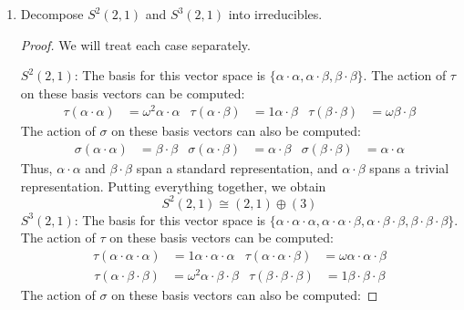 \documentclass[../psets.tex]{subfiles}
\begin{document}
\begin{enumerate}
\begin{enumerate}
\begin{proof}
\begin{align*}
                \Aboxed{\Lambda^2V &\cong (2,1)\oplus(1,1,1)}
            \end{align*}
        \end{proof}
        \item Decompose $S^2(2,1)$ and $S^3(2,1)$ into irreducibles.
        \begin{proof}
            We will treat each case separately.\par
            \underline{$S^2(2,1)$}: The basis for this vector space is $\{\alpha\cdot\alpha,\alpha\cdot\beta,\beta\cdot\beta\}$. The action of $\tau$ on these basis vectors can be computed:
            \begin{align*}
                \tau(\alpha\cdot\alpha) &= \omega^2\alpha\cdot\alpha&
                \tau(\alpha\cdot\beta) &= 1\alpha\cdot\beta&
                \tau(\beta\cdot\beta) &= \omega\beta\cdot\beta
            \end{align*}
            The action of $\sigma$ on these basis vectors can also be computed:
            \begin{align*}
                \sigma(\alpha\cdot\alpha) &= \beta\cdot\beta&
                \sigma(\alpha\cdot\beta) &= \alpha\cdot\beta&
                \sigma(\beta\cdot\beta) &= \alpha\cdot\alpha
            \end{align*}
            Thus, $\alpha\cdot\alpha$ and $\beta\cdot\beta$ span a standard representation, and $\alpha\cdot\beta$ spans a trivial representation. Putting everything together, we obtain
            \begin{equation*}
                \boxed{S^2(2,1) \cong (2,1)\oplus(3)}
            \end{equation*}
            \underline{$S^3(2,1)$}: The basis for this vector space is $\{\alpha\cdot\alpha\cdot\alpha,\alpha\cdot\alpha\cdot\beta,\alpha\cdot\beta\cdot\beta,\beta\cdot\beta\cdot\beta\}$. The action of $\tau$ on these basis vectors can be computed:
            \begin{align*}
                \tau(\alpha\cdot\alpha\cdot\alpha) &= 1\alpha\cdot\alpha\cdot\alpha&
                \tau(\alpha\cdot\alpha\cdot\beta) &= \omega\alpha\cdot\alpha\cdot\beta
            \end{align*}
            \begin{align*}
                \tau(\alpha\cdot\beta\cdot\beta) &= \omega^2\alpha\cdot\beta\cdot\beta&
                \tau(\beta\cdot\beta\cdot\beta) &= 1\beta\cdot\beta\cdot\beta
            \end{align*}
            The action of $\sigma$ on these basis vectors can also be computed:

\end{proof}
\end{enumerate}
\end{enumerate}
\end{document}
